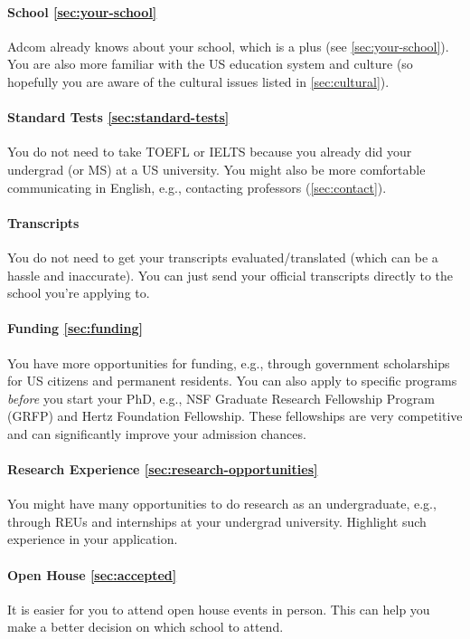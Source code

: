 \documentclass[oneside,11pt,dvipsnames]{book}
\begin{document}
\paragraph{School \autoref{sec:your-school}} Adcom already knows about your school, which is a plus (see \autoref{sec:your-school}). You are also more familiar with the US education system and culture (so hopefully you are aware of the cultural issues listed in \autoref{sec:cultural}).

\paragraph{Standard Tests \autoref{sec:standard-tests}} You do not need to take TOEFL or IELTS because you already did your undergrad (or MS) at a US university.  You might also be more comfortable communicating in English, e.g., contacting professors (\autoref{sec:contact}).

\paragraph{Transcripts} You do not need to get your transcripts evaluated/translated (which can be a hassle and inaccurate).  You can just send your official transcripts directly to the school you're applying to.

\paragraph{Funding \autoref{sec:funding}} You have more opportunities for funding, e.g., through government scholarships for US citizens and permanent residents.  You can also apply to specific programs \emph{before} you start your PhD, e.g., NSF Graduate Research Fellowship Program (GRFP) and Hertz Foundation Fellowship.  These fellowships are very competitive and can significantly improve your admission chances.

\paragraph{Research Experience \autoref{sec:research-opportunities}} You might have many opportunities to do research as an undergraduate, e.g., through REUs and internships at your undergrad university.  Highlight such experience in your application.

\paragraph{Open House \autoref{sec:accepted}} It is easier for you to attend open house events in person.  This can help you make a better decision on which school to attend.
\end{document}

